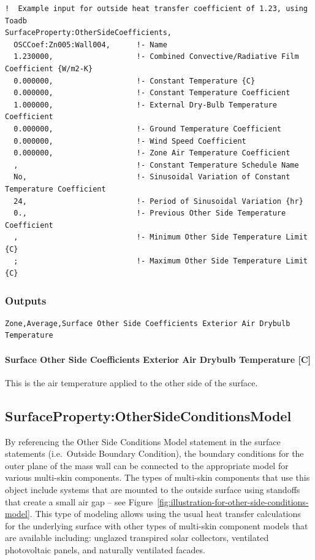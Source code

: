 \begin{lstlisting}
!  Example input for outside heat transfer coefficient of 1.23, using Toadb
SurfaceProperty:OtherSideCoefficients,
  OSCCoef:Zn005:Wall004,      !- Name
  1.230000,                   !- Combined Convective/Radiative Film Coefficient {W/m2-K}
  0.000000,                   !- Constant Temperature {C}
  0.000000,                   !- Constant Temperature Coefficient
  1.000000,                   !- External Dry-Bulb Temperature Coefficient
  0.000000,                   !- Ground Temperature Coefficient
  0.000000,                   !- Wind Speed Coefficient
  0.000000,                   !- Zone Air Temperature Coefficient
  ,                           !- Constant Temperature Schedule Name
  No,                         !- Sinusoidal Variation of Constant Temperature Coefficient
  24,                         !- Period of Sinusoidal Variation {hr}
  0.,                         !- Previous Other Side Temperature Coefficient
  ,                           !- Minimum Other Side Temperature Limit {C}
  ;                           !- Maximum Other Side Temperature Limit {C}
\end{lstlisting}

\subsubsection{Outputs}

\begin{lstlisting}
Zone,Average,Surface Other Side Coefficients Exterior Air Drybulb Temperature
\end{lstlisting}

\paragraph{Surface Other Side Coefficients Exterior Air Drybulb Temperature {[}C{]}}\label{surface-other-side-coefficients-exterior-air-drybulb-temperature-c}

This is the air temperature applied to the other side of the surface.

\subsection{SurfaceProperty:OtherSideConditionsModel}\label{surfacepropertyothersideconditionsmodel}

By referencing the Other Side Conditions Model statement in the surface statements (i.e.~Outside Boundary Condition), the boundary conditions for the outer plane of the mass wall can be connected to the appropriate model for various multi-skin components. The types of multi-skin components that use this object include systems that are mounted to the outside surface using standoffs that create a small air gap -- see Figure~\ref{fig:illustration-for-other-side-conditions-model}. This type of modeling allows using the usual heat transfer calculations for the underlying surface with other types of multi-skin component models that are available including: unglazed transpired solar collectors, ventilated photovoltaic panels, and naturally ventilated facades.

